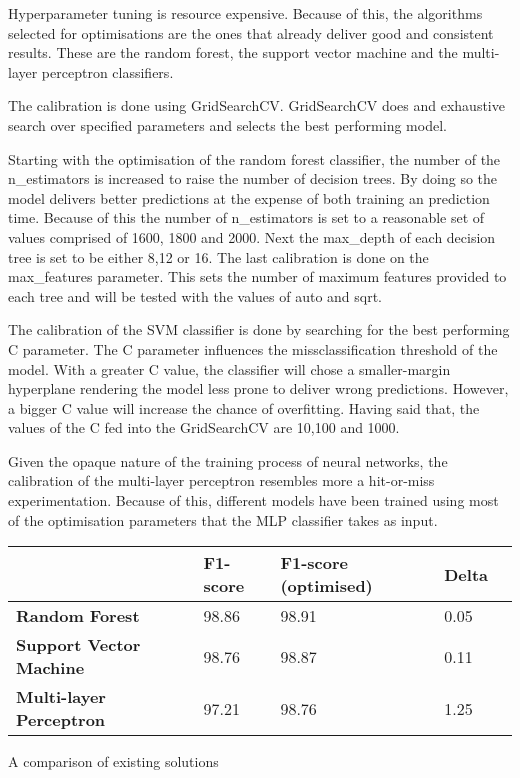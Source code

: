 Hyperparameter tuning is resource expensive. Because of this, the algorithms selected for optimisations are the ones that already deliver good and consistent results. These are the random forest, the support vector machine and the multi-layer perceptron classifiers.

The calibration is done using GridSearchCV. GridSearchCV does and exhaustive search over specified parameters and selects the best performing model. 

Starting with the optimisation of the random forest classifier, the number of the n\_estimators is increased to raise the number of decision trees. By doing so the model delivers better predictions at the expense of both training an prediction time. Because of this the number of n\_estimators is set to a reasonable set of values comprised of 1600, 1800 and 2000. Next the max\_depth of each decision tree is set to be either 8,12 or 16. The last calibration is done on the max\_features parameter. This sets the number of maximum features provided to each tree and will be tested with the values of auto and sqrt.

The calibration of the SVM classifier is done by searching for the best performing C parameter. The C parameter influences the missclassification threshold of the model. With a greater C value, the classifier will chose a smaller-margin hyperplane rendering the model less prone to deliver wrong predictions. However, a bigger C value will increase the chance of overfitting. Having said that, the values of the C fed into the GridSearchCV are 10,100 and 1000.

Given the opaque nature of the training process of neural networks, the calibration of the multi-layer perceptron resembles more a hit-or-miss experimentation. Because of this, different models have been trained using most of the optimisation parameters that the MLP classifier takes as input.

\begin{singlespace}
	\small
	\begin{center}
		\label{tab:OPTIMISED_MODELS}
		\begin{tabular}{ | m{8em} | m{13em} | m{8.5em} | m{2.3em} | m{5em} | }
			\hline
			                                & \textbf{F1-score} & \textbf{F1-score (optimised)} & \textbf{Delta}\\ 
			\hline
			\textbf{Random Forest}          & 98.86  & 98.91  & 0.05         \\
			\hline
			\textbf{Support Vector Machine} & 98.76  &98.87   & 0.11       \\
			\hline
			\textbf{Multi-layer Perceptron} & 97.21   & 98.76  & 1.25        \\
			\hline
		\end{tabular}
		\captionsetup{type=table}\caption{A comparison of existing solutions \citep{INTELLIGENT_PHISHING_ANFIS}}
	\end{center}
\end{singlespace}

